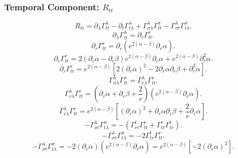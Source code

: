 \documentclass[11pt, a4paper]{report}
\begin{document}
\subsubsection{Temporal Component: $R_{tt}$}
\begin{equation}
R_{tt} = \partial_\lambda \Gamma^\lambda_{tt} - \partial_t \Gamma^\lambda_{t\lambda} + \Gamma^\lambda_{\sigma\lambda} \Gamma^\sigma_{tt} - \Gamma^\lambda_{\sigma t} \Gamma^\sigma_{t\lambda}.
\end{equation}
\begin{equation}
\partial_\lambda \Gamma^\lambda_{tt} = \partial_r \Gamma^r_{tt}.
\end{equation}
\begin{equation}
\partial_r \Gamma^r_{tt} = \partial_r \left( e^{2(\alpha-\beta)} \partial_r\alpha \right).
\end{equation}
\begin{equation}
\partial_r \Gamma^r_{tt} = 2(\partial_r\alpha - \partial_r\beta)e^{2(\alpha-\beta)}\partial_r\alpha + e^{2(\alpha-\beta)}\partial_r^2\alpha.
\end{equation}
\begin{equation}
\partial_r \Gamma^r_{tt} = e^{2(\alpha-\beta)} \left[ 2(\partial_r\alpha)^2 - 2\partial_r\alpha\partial_r\beta + \partial_r^2\alpha \right].
\end{equation}
\begin{equation}
\Gamma^\lambda_{\sigma\lambda} \Gamma^\sigma_{tt} = \Gamma^\lambda_{r\lambda} \Gamma^r_{tt}.
\end{equation}
\begin{equation}
\Gamma^\lambda_{r\lambda} \Gamma^r_{tt} = \left( \partial_r\alpha + \partial_r\beta + \frac{2}{r} \right) \left( e^{2(\alpha-\beta)} \partial_r\alpha \right).
\end{equation}
\begin{equation}
\Gamma^\lambda_{r\lambda} \Gamma^r_{tt} = e^{2(\alpha-\beta)} \left[ (\partial_r\alpha)^2 + \partial_r\alpha\partial_r\beta + \frac{2}{r}\partial_r\alpha \right].
\end{equation}
\begin{equation}
-\Gamma^\lambda_{\sigma t} \Gamma^\sigma_{t\lambda} = -\left( \Gamma^t_{rt} \Gamma^r_{tt} + \Gamma^r_{tt} \Gamma^t_{tr} \right).
\end{equation}
\begin{equation}
-\Gamma^\lambda_{\sigma t} \Gamma^\sigma_{t\lambda} = -2 \Gamma^t_{tr} \Gamma^r_{tt}.
\end{equation}
\begin{equation}
-\Gamma^\lambda_{\sigma t} \Gamma^\sigma_{t\lambda} = -2 (\partial_r\alpha) \left( e^{2(\alpha-\beta)} \partial_r\alpha \right) = e^{2(\alpha-\beta)} \left[ -2(\partial_r\alpha)^2 \right].
\end{equation}
\end{document}
